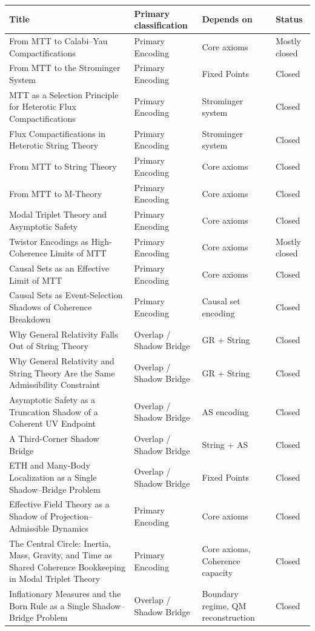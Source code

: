 \documentclass[11pt]{article}
\begin{document}
\begin{center}
\small
\begin{tabular}{|p{7.2cm}|p{3.6cm}|p{3.6cm}|p{1.6cm}|}
\hline
\textbf{Title} & \textbf{Primary classification} & \textbf{Depends on} & \textbf{Status}\\
\hline
From MTT to Calabi--Yau Compactifications
& Primary Encoding & Core axioms & Mostly closed\\
\hline
From MTT to the Strominger System
& Primary Encoding & Fixed Points & Closed\\
\hline
MTT as a Selection Principle for Heterotic Flux Compactifications
& Primary Encoding & Strominger system & Closed\\
\hline
Flux Compactifications in Heterotic String Theory
& Primary Encoding & Strominger system & Closed\\
\hline
From MTT to String Theory
& Primary Encoding & Core axioms & Closed\\
\hline
From MTT to M-Theory
& Primary Encoding & Core axioms & Closed\\
\hline
Modal Triplet Theory and Asymptotic Safety
& Primary Encoding & Core axioms & Closed\\
\hline
Twistor Encodings as High-Coherence Limits of MTT
& Primary Encoding & Core axioms & Mostly closed\\
\hline
Causal Sets as an Effective Limit of MTT
& Primary Encoding & Core axioms & Closed\\
\hline
Causal Sets as Event-Selection Shadows of Coherence Breakdown
& Primary Encoding & Causal set encoding & Closed\\
\hline
Why General Relativity Falls Out of String Theory
& Overlap / Shadow Bridge & GR + String & Closed\\
\hline
Why General Relativity and String Theory Are the Same Admissibility Constraint
& Overlap / Shadow Bridge & GR + String & Closed\\
\hline
Asymptotic Safety as a Truncation Shadow of a Coherent UV Endpoint
& Overlap / Shadow Bridge & AS encoding & Closed\\
\hline
A Third-Corner Shadow Bridge
& Overlap / Shadow Bridge & String + AS & Closed\\
\hline
ETH and Many-Body Localization as a Single Shadow--Bridge Problem
& Overlap / Shadow Bridge & Fixed Points & Closed\\
\hline
Effective Field Theory as a Shadow of Projection--Admissible Dynamics &
Primary Encoding & Core axioms & Closed \\
\hline
The Central Circle: Inertia, Mass, Gravity, and Time as Shared Coherence
Bookkeeping in Modal Triplet Theory
& Primary Encoding
& Core axioms, Coherence capacity
& Closed \\
\hline
Inflationary Measures and the Born Rule as a Single Shadow–Bridge Problem
& Overlap / Shadow Bridge & Boundary regime, QM reconstruction & Closed \\
\hline
\end{tabular}
\end{center}
\end{document}

